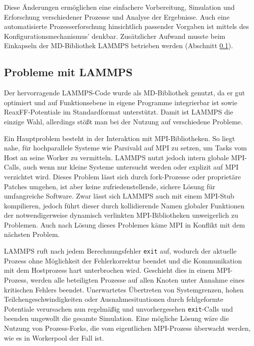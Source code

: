 Diese Änderungen ermöglichen eine einfachere Vorbereitung, Simulation und Erforschung verschiedener Prozesse und Analyse der Ergebnisse.
Auch eine automatisierte Prozesserforschung hinsichtlich passender Vorgaben ist mittels des Konfigurationsmechanismus' denkbar.
Zusätzlicher Aufwand musste beim Einkapseln der MD-Bibliothek LAMMPS betrieben werden (Abschnitt \ref{lammpssucks}).

\subsection{Probleme mit LAMMPS}
\label{lammpssucks}

Der hervorragende LAMMPS-Code wurde als MD-Bibliothek genutzt, da er gut optimiert und auf Funktionsebene in eigene Programme integrierbar ist sowie ReaxFF-Potentiale im Standardformat unterstützt.
Damit ist LAMMPS die einzige Wahl, allerdings stößt man bei der Nutzung auf verschiedene Probleme.

Ein Hauptproblem besteht in der Interaktion mit MPI-Bibliotheken.
So liegt nahe, für hochparallele Systeme wie Parsivald auf MPI zu setzen, um Tasks vom Host an seine Worker zu vermitteln.
LAMMPS nutzt jedoch intern globale MPI-Calls, auch wenn nur kleine Systeme untersucht werden oder explizit auf MPI verzichtet wird.
Dieses Problem lässt sich durch fork-Prozesse oder proprietäre Patches umgehen, ist aber keine zufriedenstellende, sichere Lösung für umfangreiche Software.
Zwar lässt sich LAMMPS auch mit einem MPI-Stub kompilieren, jedoch führt dieser durch kollidierende Namen globaler Funktionen der notwendigerweise dynamisch verlinkten MPI-Bibliotheken unweigerlich zu Problemen.
Auch nach Lösung dieses Problemes käme MPI in Konflikt mit dem nächsten Problem.

LAMMPS ruft nach jedem Berechnungsfehler \texttt{exit} auf, wodurch der aktuelle Prozess ohne Möglichkeit der Fehlerkorrektur beendet und die Kommunikation mit dem Hostprozess hart unterbrochen wird.
Geschieht dies in einem MPI-Prozess, werden alle beteiligten Prozesse auf allen Knoten unter Annahme eines kritischen Fehlers beendet.
Unerwartetes Übertreten von Systemgrenzen, hohen Teilchengeschwindigkeiten oder Ausnahmesituationen durch fehlgeformte Potentiale verursachen nun regelmäßig und unvorhergesehen \texttt{exit}-Calls und beenden ungewollt die gesamte Simulation.
Eine mögliche Lösung wäre die Nutzung von Prozess-Forks, die vom eigentlichen MPI-Prozess überwacht werden, wie es in Workerpool der Fall ist.

